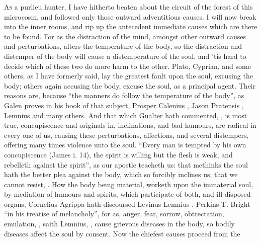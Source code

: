 \lettrine{A}{s} a purlieu hunter, I have hitherto beaten about the circuit of
the forest of this microcosm, and followed only those outward adventitious
causes. I will now break into the inner rooms, and rip up the antecedent
immediate causes which are there to be found. For as the distraction of the
mind, amongst other outward causes and perturbations, alters the temperature of
the body, so the distraction and distemper of the body will cause a
distemperature of the soul, and 'tis hard to decide which of these two do more
harm to the other. Plato, Cyprian, and some others, as I have formerly said,
lay the greatest fault upon the soul, excusing the body; others again accusing
the body, excuse the soul, as a principal agent. Their reasons are, because
\enquote{the manners do follow the temperature of the body}, as
Galen proves in his book of that subject, Prosper Calenius
, Jason Pratensis , Lemnius  and many others. And that
which Gualter hath commented, , is most true, concupiscence and originals in, inclinations, and bad
humours, are radical in every one of us, causing these
perturbations, affections, and several distempers, offering many times violence
unto the soul. \enquote{Every man is tempted by his own concupiscence (James i. 14),
the spirit is willing but the flesh is weak, and rebelleth against the spirit},
as our apostle teacheth us: that methinks the soul hath
the better plea against the body, which so forcibly inclines us, that we cannot
resist, . How the body
being material, worketh upon the immaterial soul, by mediation of humours and
spirits, which participate of both, and ill-disposed organs, Cornelius Agrippa
hath discoursed  Levinus Lemnius . Perkins  T. Bright  \enquote{in
his treatise of melancholy}, for as, anger, fear, sorrow,
obtrectation, emulation, \etc{} ,
saith Lemnius, , cause grievous diseases in the body, so bodily
diseases affect the soul by consent. Now the chiefest causes proceed from the
